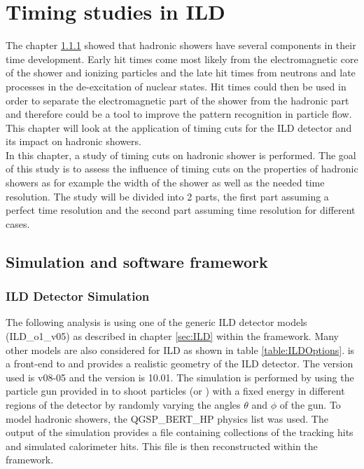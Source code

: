 \chapter{Timing studies in ILD}

The chapter \ref{} showed that hadronic showers have several components in their time development. Early hit times come most likely from the electromagnetic core of the shower and ionizing particles and the late hit times from neutrons and late processes in the de-excitation of nuclear states. Hit times could then be used in order to separate the electromagnetic part of the shower from the hadronic part and therefore could be a tool to improve the pattern recognition in particle flow. This chapter will look at the application of timing cuts for the ILD detector and its impact on hadronic showers.\\

In this chapter, a study of timing cuts on hadronic shower is performed. The goal of this study is to assess the influence of timing cuts on the properties of hadronic showers as for example the width of the shower as well as the needed time resolution. The study will be divided into 2 parts, the first part assuming a perfect time resolution and the second part assuming time resolution for different cases.

\section{Simulation and software framework}

\subsection{ILD Detector Simulation}

The following analysis is using one of the generic ILD detector models (ILD\_o1\_v05) as described in chapter \ref{sec:ILD} within the \mokka framework. Many other models are also considered for ILD as shown in table \ref{table:ILDOptions}. \mokka is a front-end to \geant and provides a realistic geometry of the ILD detector. The \mokka version used is v08-05 and the \geant version is 10.01.
The simulation is performed by using the particle gun provided in \geant to shoot particles (\piminus or \kzeroL) with a fixed energy in different regions of the detector by randomly varying the angles $\theta$ and $\phi$ of the gun. To model hadronic showers, the QGSP\_BERT\_HP physics list was used. The output of the simulation provides a \lcio file containing collections of the tracking hits and simulated calorimeter hits. This file is then reconstructed within the \marlin framework.

